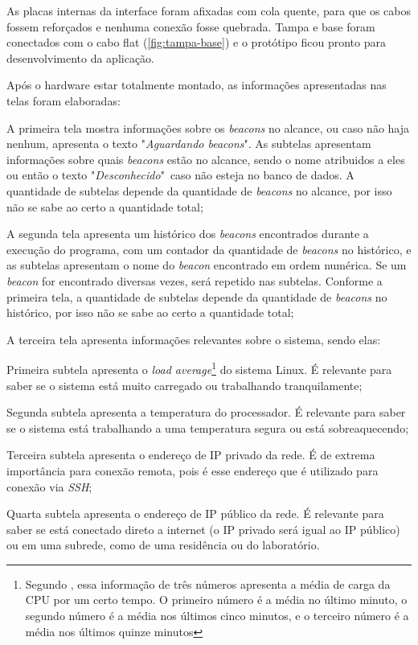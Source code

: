 As placas internas da interface foram afixadas com cola quente, para que os cabos fossem reforçados e nenhuma conexão fosse quebrada. Tampa e base foram conectados com o cabo flat (\autoref{fig:tampa-base}) e o protótipo ficou pronto para desenvolvimento da aplicação.

Após o hardware estar totalmente montado, as informações apresentadas nas telas foram elaboradas:

\begin{alineas}
	\item A primeira tela mostra informações sobre os \textit{beacons} no alcance, ou caso não haja nenhum, apresenta o texto "\textit{Aguardando beacons}". As subtelas apresentam informações sobre quais \textit{beacons} estão no alcance, sendo o nome atribuidos a eles ou então o texto "\textit{Desconhecido}"\ caso não esteja no banco de dados. A quantidade de subtelas depende da quantidade de \textit{beacons} no alcance, por isso não se sabe ao certo a quantidade total;
	\item A segunda tela apresenta um histórico dos \textit{beacons} encontrados durante a execução do programa, com um contador da quantidade de \textit{beacons} no histórico, e as subtelas apresentam o nome do \textit{beacon} encontrado em ordem numérica. Se um \textit{beacon} for encontrado diversas vezes, será repetido nas subtelas. Conforme a primeira tela, a quantidade de subtelas depende da quantidade de \textit{beacons} no histórico, por isso não se sabe ao certo a quantidade total;
	\item A terceira tela apresenta informações relevantes sobre o sistema, sendo elas:
	\begin{subalineas}
		\item Primeira subtela apresenta o \textit{load average}\footnote{Segundo , essa informação de três números apresenta a média de carga da CPU por um certo tempo. O primeiro número é a média no último minuto, o segundo número é a média nos últimos cinco minutos, e o terceiro número é a média nos últimos quinze minutos} do sistema Linux. É relevante para saber se o sistema está muito carregado ou trabalhando tranquilamente;
		\item Segunda subtela apresenta a temperatura do processador. É relevante para saber se o sistema está trabalhando a uma temperatura segura ou está sobreaquecendo;
		\item Terceira subtela apresenta o endereço de IP privado da rede. É de extrema importância para conexão remota, pois é esse endereço que é utilizado para conexão via \textit{SSH};
		\item Quarta subtela apresenta o endereço de IP público da rede. É relevante para saber se está conectado direto a internet (o IP privado será igual ao IP público) ou em uma subrede, como de uma residência ou do laboratório.
	\end{subalineas}
\end{alineas}


